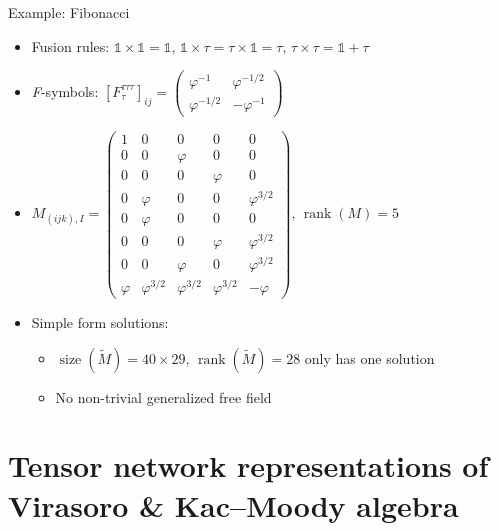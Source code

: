 \documentclass{fdubeamer}
\newcommand{\1}{\mathbb{1}}
\DeclareMathOperator{\rank}{rank}
\begin{document}
\begin{frame}{Example: Fibonacci}

\begin{itemize}
  \item Fusion rules: $
      \1 \times \1 = \1, \,
      \1 \times \tau = \tau \times \1 = \tau, \,
      \tau \times \tau = \1 + \tau
    $
  \item \textit{F}-symbols: $
      [F^{\tau\tau\tau}_\tau]_{ij} = \left( \begin{smallmatrix}
        \varphi^{-1}   &  \varphi^{-1/2} \\
        \varphi^{-1/2} & -\varphi^{-1}
      \end{smallmatrix} \right)
    $ \\[1ex]
  \item $
      M_{(ijk), I} = \left( \begin{smallmatrix}
        1 & 0 & 0 & 0 & 0 \\
        0 & 0 & \varphi & 0 & 0 \\
        0 & 0 & 0 & \varphi & 0 \\
        0 & \varphi & 0 & 0 & \varphi^{3/2} \\
        0 & \varphi & 0 & 0 & 0 \\
        0 & 0 & 0 & \varphi & \varphi^{3/2} \\
        0 & 0 & \varphi & 0 & \varphi^{3/2} \\
        \varphi & \varphi^{3/2} & \varphi^{3/2} & \varphi^{3/2} & -\varphi
      \end{smallmatrix} \right)\!, \,
      \rank(M) = 5
    $ \\[1ex]

  \item Simple form solutions:

    \begin{itemize}
      \item $\operatorname{size}(\tilde{M})=40\times29, \, \rank(\tilde{M})=28$
        \textrightarrow{} only has one solution
      \item No non-trivial generalized free field
    \end{itemize}
\end{itemize}

\end{frame}

\section{Tensor network representations of \\ Virasoro \& Kac--Moody algebra}
\end{document}

